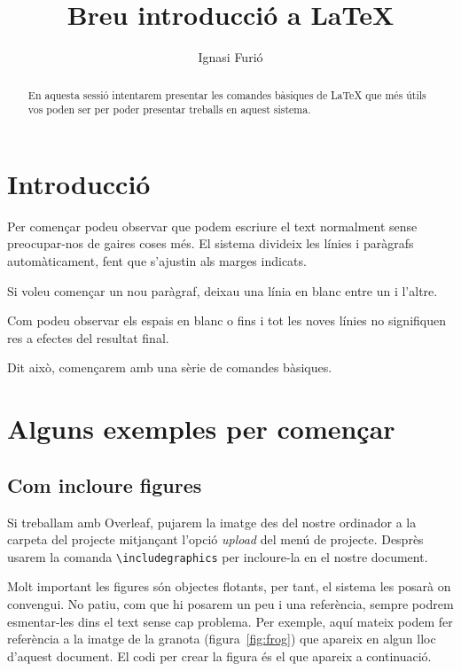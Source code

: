 \documentclass[a4paper]{article}
\title{Breu introducció a \LaTeX}
\author{Ignasi Furió}
\begin{document}
\maketitle

\begin{abstract}
En aquesta sessió intentarem presentar les comandes bàsiques de LaTeX que més útils vos poden ser per poder presentar treballs en aquest sistema.
\end{abstract}

\section{Introducció}

Per començar podeu observar que podem escriure el text normalment sense preocupar-nos de gaires coses més. El sistema divideix les línies i paràgrafs automàticament, fent que s'ajustin als marges indicats.

Si voleu començar un nou paràgraf, deixau una línia en blanc entre un i l'altre.

Com podeu observar       els         espais en blanc
o fins i tot les noves línies 
no signifiquen res a efectes del resultat final.

Dit això, començarem amb una sèrie de comandes bàsiques.

\section{Alguns exemples per començar}

\subsection{Com incloure figures}\label{sec:imatges}

Si treballam amb Overleaf, pujarem la imatge des del nostre ordinador a la carpeta del projecte mitjançant l'opció \emph{upload} del menú de projecte. Desprès usarem la comanda \texttt{\textbackslash{}includegraphics} per incloure-la en el nostre document. 

Molt important les figures són objectes flotants, per tant, el sistema les posarà on convengui. No patiu, com que hi posarem un peu i una referència, sempre podrem esmentar-les dins el text sense cap problema. Per exemple, aquí mateix podem fer referència a la imatge de la granota (figura~\ref{fig:frog}) que apareix en algun lloc d'aquest document. El codi per crear la figura és el que apareix a continuació.
\end{document}
